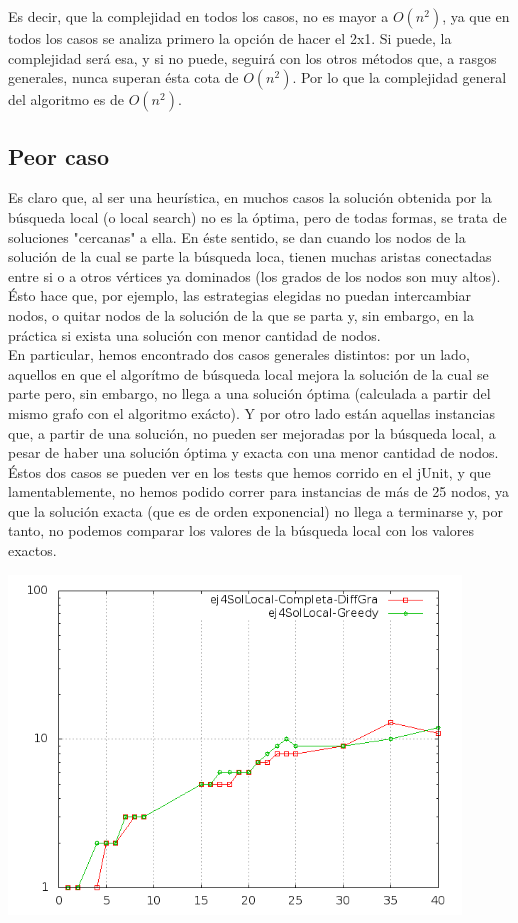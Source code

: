  Es decir, que la complejidad en todos los casos, no es mayor a $O(n^2)$, ya que en todos los casos se analiza primero la opción de hacer el 2x1. Si puede, la complejidad será esa, y si no puede, seguirá con los otros métodos que, a rasgos generales, nunca superan ésta cota de $O(n^2)$. Por lo que la complejidad general del algoritmo es de \textbf{$O(n^2)$}.
 
 \subsection{Peor caso}
 Es claro que, al ser una heurística, en muchos casos la solución obtenida por la búsqueda local (o local search) no es la óptima, pero de todas formas, se trata de soluciones "cercanas" a ella. En éste sentido, se dan cuando los nodos de la solución de la cual se parte la búsqueda loca, tienen muchas aristas conectadas entre si o a otros vértices ya dominados (los grados de los nodos son muy altos). Ésto hace que, por ejemplo, las estrategias elegidas no puedan intercambiar nodos, o quitar nodos de la solución de la que se parta y, sin embargo, en la práctica si exista una solución con menor cantidad de nodos. \\
En particular, hemos encontrado dos casos generales distintos: por un lado, aquellos en que el algorítmo de búsqueda local mejora la solución de la cual se parte pero, sin embargo, no llega a una solución óptima (calculada a partir del mismo grafo con el algoritmo exácto). Y por otro lado están aquellas instancias que, a partir de una solución, no pueden ser mejoradas por la búsqueda local, a pesar de haber una solución óptima y exacta con una menor cantidad de nodos. Éstos dos casos se pueden ver en los tests que hemos corrido en el jUnit, y que lamentablemente, no hemos podido correr para instancias de más de 25 nodos, ya que la solución exacta (que es de orden exponencial) no llega a terminarse y, por tanto, no podemos comparar los valores de la búsqueda local con los valores exactos. \\
\begin{center}
\includegraphics[width=12cm]{./graficos/comparacionSolucionPasadaLocal.png}
\end{center}
